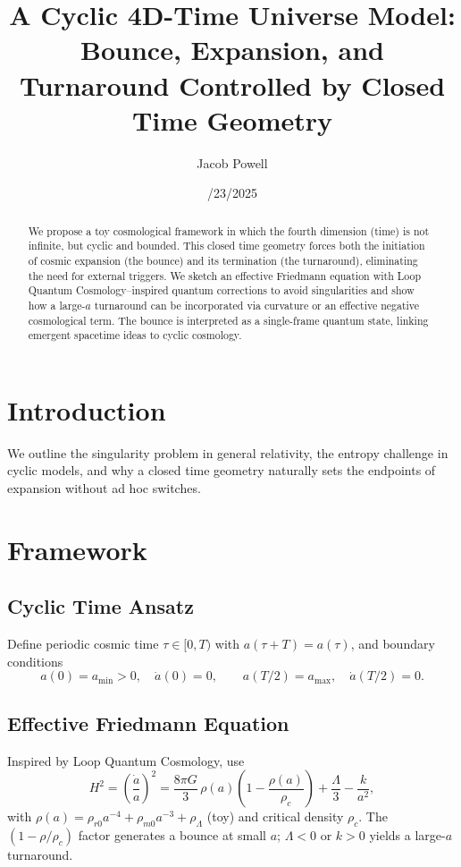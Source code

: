 \documentclass[12pt]{article}
\title{A Cyclic 4D-Time Universe Model: Bounce, Expansion, and Turnaround Controlled by Closed Time Geometry}
\author{Jacob Powell}
\date{\08/23/2025}
\begin{document}
\maketitle

\begin{abstract}
We propose a toy cosmological framework in which the fourth dimension (time) is not infinite,
but cyclic and bounded. This closed time geometry forces both the initiation of cosmic expansion
(the bounce) and its termination (the turnaround), eliminating the need for external triggers.
We sketch an effective Friedmann equation with Loop Quantum Cosmology--inspired quantum corrections
to avoid singularities and show how a large-$a$ turnaround can be incorporated via curvature or an
effective negative cosmological term. The bounce is interpreted as a single-frame quantum state,
linking emergent spacetime ideas to cyclic cosmology.
\end{abstract}

\section{Introduction}
We outline the singularity problem in general relativity, the entropy challenge in cyclic models,
and why a closed time geometry naturally sets the endpoints of expansion without ad hoc switches.

\section{Framework}
\subsection{Cyclic Time Ansatz}
Define periodic cosmic time $\tau\in[0,T)$ with $a(\tau+T)=a(\tau)$, and boundary conditions
\begin{equation}
a(0)=a_{\min}>0,\quad \dot a(0)=0,\qquad a(T/2)=a_{\max},\quad \dot a(T/2)=0.
\end{equation}

\subsection{Effective Friedmann Equation}
Inspired by Loop Quantum Cosmology, use
\begin{equation}
H^2=\left(\frac{\dot a}{a}\right)^2=\frac{8\pi G}{3}\,\rho(a)\left(1-\frac{\rho(a)}{\rho_c}\right)
+\frac{\Lambda}{3}-\frac{k}{a^2},
\end{equation}
with $\rho(a)=\rho_{r0}a^{-4}+\rho_{m0}a^{-3}+\rho_\Lambda$ (toy) and critical density $\rho_c$.
The $(1-\rho/\rho_c)$ factor generates a bounce at small $a$; $\Lambda<0$ or $k>0$ yields a
large-$a$ turnaround.
\end{document}
